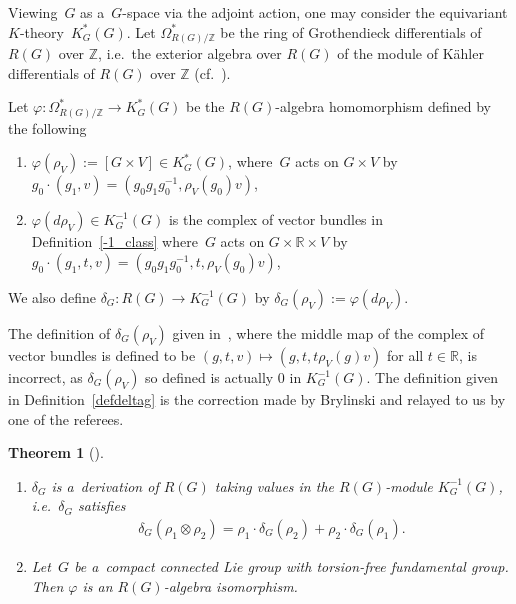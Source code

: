 \documentclass[11pt]{article}
\numberwithin{equation}{section}
\newtheorem{Theorem}{Theorem}[section]
\begin{document}
Viewing~$G$ as a~$G$-space via the adjoint action, one may consider the equivariant $K$-theo\-ry~$K_G^*(G)$.
Let $\Omega^*_{R(G)/\mathbb{Z}}$ be the ring of Grothendieck dif\/ferentials of $R(G)$ over $\mathbb{Z}$, i.e.\
the exterior algebra over $R(G)$ of the module of K\"ahler dif\/ferentials of $R(G)$ over $\mathbb{Z}$ (cf.~\cite{BZ}).
\begin{Definition}
\label{defdeltag}
Let $\varphi: \Omega_{R(G)/\mathbb{Z}}^*\to K_G^*(G)$ be the $R(G)$-algebra homomorphism def\/ined by the following
\begin{enumerate}\itemsep=0pt
\item[1)]
$\varphi(\rho_V):=[G\times V]\in K_G^*(G)$, where~$G$ acts on $G\times V$ by $g_0\cdot(g_1, v)=(g_0g_1g_0^{-1},
\rho_V(g_0)v)$,
\item[2)]
$\varphi(d\rho_V)\in K_G^{-1}(G)$ is the complex of vector bundles in Def\/inition~\ref{-1_class} where~$G$ acts on
$G\times \mathbb{R}\times V$ by $g_0\cdot(g_1, t, v)=(g_0g_1g_0^{-1}, t, \rho_V(g_0)v)$,
\end{enumerate}
We also def\/ine $\delta_G: R(G)\to K^{-1}_G (G)$ by $\delta_G(\rho_V):=\varphi(d\rho_V)$.
\end{Definition}
\begin{Remark}
The def\/inition of $\delta_G(\rho_V)$ given in~\cite{BZ}, where the middle map of the complex of vector bundles is
def\/ined to be $(g, t, v)\mapsto(g, t, t\rho_V(g)v)$ for all $t\in\mathbb{R}$, is incorrect, as $\delta_G(\rho_V)$ so
def\/ined is actually 0 in $K_G^{-1}(G)$.
The def\/inition given in Def\/inition~\ref{defdeltag} is the correction made by Brylinski and relayed to us by one of the
referees.
\end{Remark}
\begin{Theorem}[\cite{BZ}]\label{eqderivation}\quad
\begin{enumerate}\itemsep=0pt
\item[$1.$]
$\delta_G$ is a~derivation of $R(G)$ taking values in the $R(G)$-module $K^{-1}_G(G)$, i.e.\
$\delta_G$ satisfies
\begin{gather}
\label{eqleibniz}
\delta_G(\rho_1\otimes\rho_2)=\rho_1\cdot\delta_G(\rho_2)+\rho_2\cdot\delta_G(\rho_1).
\end{gather}
\item[$2.$]
Let~$G$ be a~compact connected Lie group with torsion-free fundamental group.
Then $\varphi$ is an $R(G)$-algebra isomorphism.
\end{enumerate}
\end{Theorem}
\end{document}
